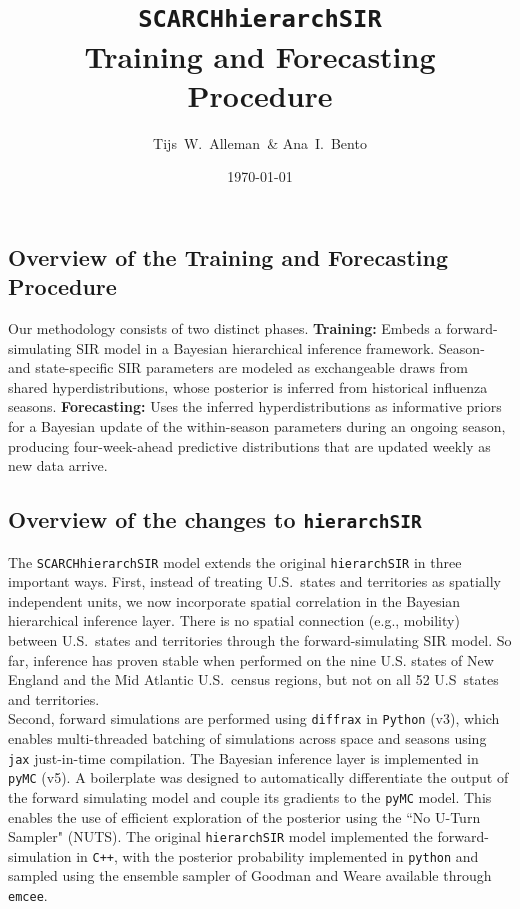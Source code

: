 \documentclass[11pt]{article}
\title{\texttt{SCARCHhierarchSIR}\\Training and Forecasting Procedure}
\author{Tijs~W.~Alleman~\& Ana~I.~Bento}
\date{\today}
\begin{document}
\maketitle


\subsection*{Overview of the Training and Forecasting Procedure}

Our methodology consists of two distinct phases. \textbf{Training:} Embeds a forward-simulating SIR model in a Bayesian hierarchical inference framework. Season- and state-specific SIR parameters are modeled as exchangeable draws from shared hyperdistributions, whose posterior is inferred from historical influenza seasons. \textbf{Forecasting:} Uses the inferred hyperdistributions as informative priors for a Bayesian update of the within-season parameters during an ongoing season, producing four-week-ahead predictive distributions that are updated weekly as new data arrive.


\subsection*{Overview of the changes to \texttt{hierarchSIR}}

The \texttt{SCARCHhierarchSIR} model extends the original \texttt{hierarchSIR} in three important ways. First, instead of treating U.S.\ states and territories as spatially independent units, we now incorporate spatial correlation in the Bayesian hierarchical inference layer. There is no spatial connection (e.g., mobility) between U.S.\ states and territories through the forward-simulating SIR model. So far, inference has proven stable when performed on the nine U.S. states of New England and the Mid Atlantic U.S.\ census regions, but not on all 52 U.S\ states and territories.\\

Second, forward simulations are performed using \texttt{diffrax} in \texttt{Python} (v3), which enables multi-threaded batching of simulations across space and seasons using \texttt{jax} just-in-time compilation. The Bayesian inference layer is implemented in \texttt{pyMC} (v5). A boilerplate was designed to automatically differentiate the output of the forward simulating model and couple its gradients to the \texttt{pyMC} model. This enables the use of efficient exploration of the posterior using the ``No U-Turn Sampler" (NUTS). The original \texttt{hierarchSIR} model implemented the forward-simulation in \texttt{C++}, with the posterior probability implemented in \texttt{python} and sampled using the ensemble sampler of Goodman and Weare available through \texttt{emcee}.\\
\end{document}
